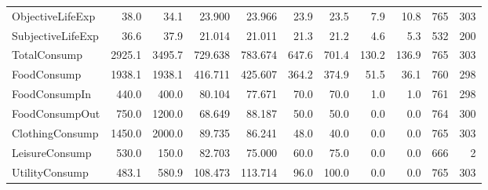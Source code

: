 \begin{table}
\begin{tabular}[t]{lrrrrrrrrrr}
\addlinespace
ObjectiveLifeExp & 38.0 & 34.1 & 23.900 & 23.966 & 23.9 & 23.5 & 7.9 & 10.8 & 765 & 303\\
SubjectiveLifeExp & 36.6 & 37.9 & 21.014 & 21.011 & 21.3 & 21.2 & 4.6 & 5.3 & 532 & 200\\
TotalConsump & 2925.1 & 3495.7 & 729.638 & 783.674 & 647.6 & 701.4 & 130.2 & 136.9 & 765 & 303\\
FoodConsump & 1938.1 & 1938.1 & 416.711 & 425.607 & 364.2 & 374.9 & 51.5 & 36.1 & 760 & 298\\
FoodConsumpIn & 440.0 & 400.0 & 80.104 & 77.671 & 70.0 & 70.0 & 1.0 & 1.0 & 761 & 298\\
\addlinespace
FoodConsumpOut & 750.0 & 1200.0 & 68.649 & 88.187 & 50.0 & 50.0 & 0.0 & 0.0 & 764 & 300\\
ClothingConsump & 1450.0 & 2000.0 & 89.735 & 86.241 & 48.0 & 40.0 & 0.0 & 0.0 & 765 & 303\\
LeisureConsump & 530.0 & 150.0 & 82.703 & 75.000 & 60.0 & 75.0 & 0.0 & 0.0 & 666 & 2\\
UtilityConsump & 483.1 & 580.9 & 108.473 & 113.714 & 96.0 & 100.0 & 0.0 & 0.0 & 765 & 303\\
\bottomrule
\end{tabular}
\end{table}
